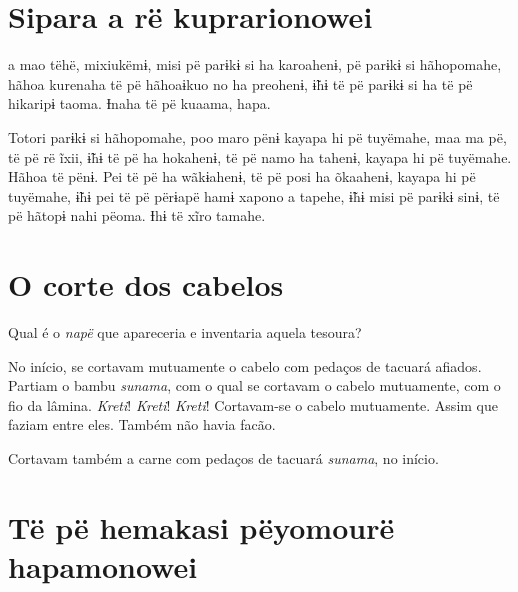 \chapter{Sipara a rë kuprarionowei}
 
 a mao tëhë, mixiukëmɨ, misi pë parɨkɨ si ha karoahenɨ, pë
parɨkɨ si hãhopomahe, hãhoa kurenaha të pë hãhoaɨkuo no ha preohenɨ,
ɨ̃hɨ të pë parɨkɨ si ha të pë hikaripɨ taoma. Ɨnaha të pë kuaama, hapa. 

Totori parɨkɨ si hãhopomahe, poo maro pënɨ kayapa hi pë tuyëmahe, maa ma
pë, të pë rë ĩxii, ɨ̃hɨ të pë ha hokahenɨ, të pë namo ha tahenɨ, kayapa
hi pë tuyëmahe. Hãhoa të pënɨ. Pei të pë ha wãkɨahenɨ, të pë posi ha
õkaahenɨ, kayapa hi pë tuyëmahe, ɨ̃hɨ pei të pë përɨapë hamɨ xapono a
tapehe, ɨ̃hɨ misi pë parɨkɨ sinɨ, të pë hãtopɨ nahi pëoma. Ɨhɨ të xĩro
tamahe. 

\chapter{O corte dos cabelos}
 
  


Qual é o \textit{napë} que apareceria e inventaria aquela tesoura?

No início, se cortavam mutuamente o cabelo com pedaços de tacuará
afiados. Partiam o bambu \textit{sunama}, com o qual se cortavam o cabelo
mutuamente, com o fio da lâmina. \textit{Kreti}! \textit{Kreti}! \textit{Kreti}! Cortavam-se o
cabelo mutuamente. Assim que faziam entre eles. Também não havia facão. 

Cortavam também a carne com pedaços de tacuará \textit{sunama}, no início.

\chapter[Të pë hemakasi pëyomou rë hapamonowei]{Të pë hemakasi pëyomou\break rë hapamonowei}
 
